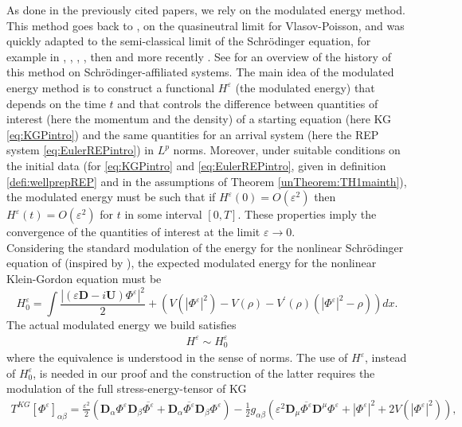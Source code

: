 \documentclass[a4paper, 15pt]{article}
\numberwithin{equation}{section}
\begin{document}
As done in the previously cited papers, we rely on the  modulated energy method. This method goes back to \cite{zbMATH01442880}, on the quasineutral limit for Vlasov-Poisson, and was quickly adapted to the semi-classical limit of the Schrödinger equation, for example in \cite{zbMATH01877186}, \cite{zbMATH01970480}, \cite{zbMATH01987564}, \cite{zbMATH05000052}, then \cite{zbMATH05243173} and more recently \cite{zbMATH07570763}. See \cite{zbMATH06101438} for an overview of the history of this method on Schrödinger-affiliated systems. The main idea of the modulated energy method is to construct a functional $H^\varepsilon$ (the modulated energy) that depends on the time $t$ and that controls the difference between quantities of interest (here the momentum and the density) of a starting equation (here KG \eqref{eq:KGPintro}) and the same quantities for an arrival system (here the REP system \eqref{eq:EulerREPintro}) in  $L^p$ norms. Moreover, under suitable conditions on the initial data (for \eqref{eq:KGPintro} and \eqref{eq:EulerREPintro}, given in definition \ref{defi:wellprepREP} and in the assumptions of Theorem \ref{unTheorem:TH1mainth}), the modulated energy must be such that if $H^\varepsilon(0)=O(\varepsilon^2)$ then $H^\varepsilon(t)=O(\varepsilon^2)$ for $t$ in some interval $[0,T]$. These properties imply the convergence of the quantities of interest at the limit $\varepsilon\to0$.\\ Considering the standard modulation of the energy for the nonlinear Schrödinger equation of  \cite{zbMATH05243173} (inspired by \cite{zbMATH05000052}), the expected modulated energy for the nonlinear Klein-Gordon equation must be 
\begin{equation}
\label{eq:moduH0}
     H^\varepsilon_0=\int{\frac{|(\varepsilon\textbf{D}-i\textbf{U})\Phi^\varepsilon|^2}{2} +\left(V(|\Phi^\varepsilon|^2)-V(\rho)-V^{\prime}(\rho)(|\Phi^\varepsilon|^2-\rho)\right)dx}.
\end{equation}
The actual modulated energy we build satisfies 
\begin{align}
    H^\varepsilon\sim H^\varepsilon_0
\end{align}
where the equivalence is understood in the sense of norms. 
The use of $H^\varepsilon$, instead of $H^\varepsilon_0$, is needed in our proof and the construction of the latter requires the modulation of the full stress-energy-tensor of KG
\begin{align}
\label{eq:stressenergintro}
    T^{KG}[\Phi^\varepsilon]_{\alpha\beta}=\frac{\varepsilon^2}{2}(\textbf{D}_\alpha\Phi^\varepsilon\textbf{D}_\beta\overline{\Phi^\varepsilon}+\textbf{D}_\alpha\overline{\Phi^\varepsilon}\textbf{D}_\beta\Phi^\varepsilon)-\frac{1}{2}g_{\alpha\beta}(\varepsilon^2\textbf{D}_\mu\overline{\Phi^\varepsilon}\textbf{D}^\mu\Phi^\varepsilon+|\Phi^\varepsilon|^2+2V(|\Phi^\varepsilon|^2)),
\end{align}
\end{document}
